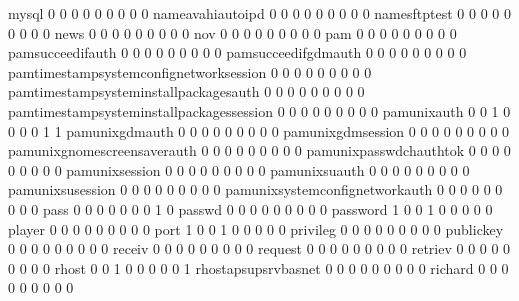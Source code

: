 \documentclass[compress,8pt]{beamer}
\begin{document}
\begin{frame}
\begin{Schunk}
  mysql                                      0   0   0   0   0   0   0   0   0
  nameavahiautoipd                           0   0   0   0   0   0   0   0   0
  namesftptest                               0   0   0   0   0   0   0   0   0
  news                                       0   0   0   0   0   0   0   0   0
  nov                                        0   0   0   0   0   0   0   0   0
  pam                                        0   0   0   0   0   0   0   0   0
  pamsucceedifauth                           0   0   0   0   0   0   0   0   0
  pamsucceedifgdmauth                        0   0   0   0   0   0   0   0   0
  pamtimestampsystemconfignetworksession     0   0   0   0   0   0   0   0   0
  pamtimestampsysteminstallpackagesauth      0   0   0   0   0   0   0   0   0
  pamtimestampsysteminstallpackagessession   0   0   0   0   0   0   0   0   0
  pamunixauth                                0   0   1   0   0   0   0   1   1
  pamunixgdmauth                             0   0   0   0   0   0   0   0   0
  pamunixgdmsession                          0   0   0   0   0   0   0   0   0
  pamunixgnomescreensaverauth                0   0   0   0   0   0   0   0   0
  pamunixpasswdchauthtok                     0   0   0   0   0   0   0   0   0
  pamunixsession                             0   0   0   0   0   0   0   0   0
  pamunixsuauth                              0   0   0   0   0   0   0   0   0
  pamunixsusession                           0   0   0   0   0   0   0   0   0
  pamunixsystemconfignetworkauth             0   0   0   0   0   0   0   0   0
  pass                                       0   0   0   0   0   0   0   1   0
  passwd                                     0   0   0   0   0   0   0   0   0
  password                                   1   0   0   1   0   0   0   0   0
  player                                     0   0   0   0   0   0   0   0   0
  port                                       1   0   0   1   0   0   0   0   0
  privileg                                   0   0   0   0   0   0   0   0   0
  publickey                                  0   0   0   0   0   0   0   0   0
  receiv                                     0   0   0   0   0   0   0   0   0
  request                                    0   0   0   0   0   0   0   0   0
  retriev                                    0   0   0   0   0   0   0   0   0
  rhost                                      0   0   1   0   0   0   0   0   1
  rhostapsupsrvbasnet                        0   0   0   0   0   0   0   0   0
  richard                                    0   0   0   0   0   0   0   0   0

\end{Schunk}
\end{frame}
\end{document}
